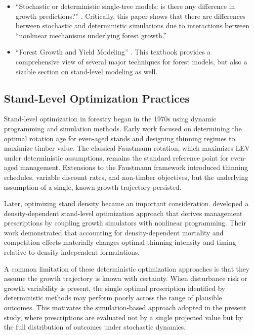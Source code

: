 \documentclass[12pt]{report}
\begin{document}
\begin{itemize}
\item ``Stochastic or deterministic single-tree models: is there any difference in growth predictions?'' \parencite{fortinStochasticDeterministicSingletree2012}.
Critically, this paper shows that there are differences between stochastic and deterministic simulations due to interactions between ``nonlinear mechanisms underlying forest growth.'' 

\item ``Forest Growth and Yield Modeling'' \parencite{weiskittelForestGrowthYield2011}.
This textbook provides a comprehensive view of several major techniques for forest models, but also a sizable section on stand-level modeling as well. 
\end{itemize}

\subsection{Stand-Level Optimization Practices}
Stand-level optimization in forestry began in the 1970s using dynamic programming and simulation methods. Early work focused on determining the optimal rotation age for even-aged stands and designing thinning regimes to maximize timber value. The classical Faustmann rotation, which maximizes LEV under deterministic assumptions, remains the standard reference point for even-aged management. Extensions to the Faustmann framework introduced thinning schedules, variable discount rates, and non-timber objectives, but the underlying assumption of a single, known growth trajectory persisted.

Later, optimizing stand density became an important consideration. \textcite{bettingerDensitydependentStandlevelOptimization2005} developed a density-dependent stand-level optimization approach that derives management prescriptions by coupling growth simulators with nonlinear programming. Their work demonstrated that accounting for density-dependent mortality and competition effects materially changes optimal thinning intensity and timing relative to density-independent formulations.

A common limitation of these deterministic optimization approaches is that they assume the growth trajectory is known with certainty. When disturbance risk or growth variability is present, the single optimal prescription identified by deterministic methods may perform poorly across the range of plausible outcomes. This motivates the simulation-based approach adopted in the present study, where prescriptions are evaluated not by a single projected value but by the full distribution of outcomes under stochastic dynamics.
\end{document}
